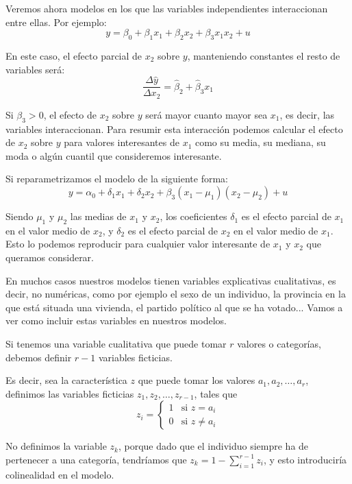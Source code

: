
Veremos ahora modelos en los que las variables independientes interaccionan entre ellas. Por ejemplo:
\[y=\beta_0+\beta_1x_1+\beta_2x_2+\beta_3x_1x_2+u\]

En este caso, el efecto parcial de $x_2$ sobre $y$, manteniendo constantes el resto de variables ser\'a:
\[\dfrac{\Delta{\hat{y}}}{\Delta{x_2}}=\hat{\beta}_2+\hat{\beta}_3x_1\]

Si $\beta_3>0$, el efecto de $x_2$ sobre $y$ ser\'a mayor cuanto mayor sea $x_1$, es decir, las variables interaccionan. Para resumir esta interacci\'on podemos calcular el efecto de $x_2$ sobre $y$ para valores interesantes de $x_1$ como su media, su mediana, su moda o alg\'un cuantil que consideremos interesante.

Si reparametrizamos el modelo de la siguiente forma:
\[y=\alpha_0+\delta_1x_1+\delta_2x_2+\beta_3(x_1-\mu_1)(x_2-\mu_2)+u\]

Siendo $\mu_1$ y $\mu_2$ las medias de $x_1$ y $x_2$, los coeficientes $\delta_1$  es el efecto parcial de $x_1$ en el valor medio de $x_2$, y $\delta_2$ es el efecto parcial de $x_2$ en el valor medio de $x_1$. Esto lo podemos reproducir para cualquier valor interesante de $x_1$ y $x_2$ que queramos considerar.


En muchos casos nuestros modelos tienen variables explicativas cualitativas, es decir, no num\'ericas, como por ejemplo el sexo de un individuo, la provincia en la que est\'a situada una vivienda, el partido pol\'itico al que se ha votado... Vamos a ver como incluir estas variables en nuestros modelos.


Si tenemos una variable cualitativa que puede tomar $r$ valores o categor\'ias, debemos definir $r-1$ variables ficticias.

Es decir, sea la caracter\'istica $z$ que puede tomar los valores $a_1, a_2,\ldots,a_r$, definimos las variables ficticias $z_1, z_2,\ldots,z_{r-1}$, tales que 
\[z_i=\left\{\begin{array}{ll}
1 & \text{si } z=a_i \\
0 & \text{si } z\neq a_i 
\end{array}\right.\]

No definimos la variable $z_k$, porque dado que el individuo siempre ha de pertenecer a una categor\'ia, tendr\'iamos que $z_k=1-\sum_{i=1}^{r-1}z_i$, y esto introducir\'ia colinealidad en el modelo.

